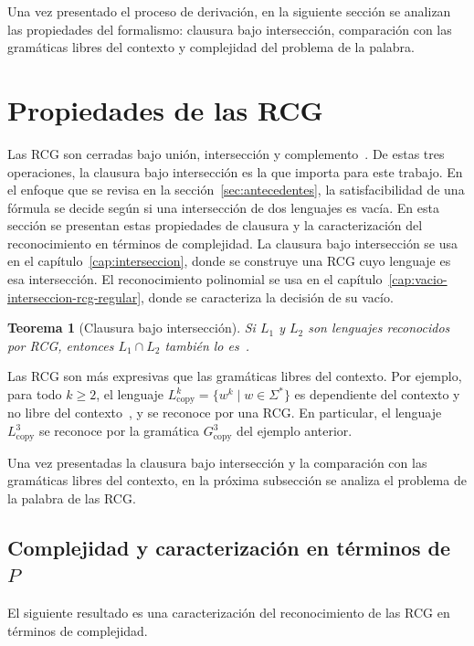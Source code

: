 \documentclass{report}
\theoremstyle{definition}
\theoremstyle{plain}
\newtheorem{teorema}{Teorema}[chapter]
\theoremstyle{remark}
\begin{document}
Una vez presentado el proceso de derivación, en la siguiente sección se
analizan las propiedades del formalismo: clausura bajo intersección,
comparación con las gramáticas libres del contexto y complejidad del
problema de la palabra.

\section{Propiedades de las RCG}
\label{sec:propiedades-rcg}

Las RCG son cerradas bajo unión, intersección y
complemento~\cite{boullier1998proposal}. De estas tres operaciones, la
clausura bajo intersección es la que importa para este trabajo. En el
enfoque que
se revisa en la sección~\ref{sec:antecedentes}, la satisfacibilidad de
una fórmula se decide según si una intersección de dos lenguajes es
vacía. En esta sección se presentan estas propiedades de clausura y la
caracterización del reconocimiento en términos de complejidad. La
clausura bajo intersección se usa en el capítulo~\ref{cap:interseccion},
donde se construye una RCG cuyo lenguaje es esa intersección. El
reconocimiento polinomial se usa en el
capítulo~\ref{cap:vacio-interseccion-rcg-regular}, donde se caracteriza la
decisión de su vacío.

\begin{teorema}[Clausura bajo intersección]
\label{teo:clausura-rcg}
Si $L_1$ y $L_2$ son lenguajes reconocidos por RCG, entonces
$L_1 \cap L_2$ también lo es~\cite{boullier1998proposal}.
\end{teorema}

Las RCG son más expresivas que las gramáticas libres del contexto. Por
ejemplo, para todo $k \ge 2$, el lenguaje $L_{\mathrm{copy}}^k = \{ w^k
\mid w \in \Sigma^*\}$ es dependiente del contexto y no libre del
contexto~\cite{hopcroft2006introduction}, y se reconoce por una RCG. En
particular, el lenguaje $L_{\mathrm{copy}}^3$ se reconoce por la
gramática $G_{\mathrm{copy}}^3$ del ejemplo anterior.

Una vez presentadas la clausura bajo intersección y la comparación con
las gramáticas libres del contexto, en la próxima subsección se analiza
el problema de la palabra de las RCG.

\subsection{Complejidad y caracterización en términos de $P$}

El siguiente resultado es una caracterización del reconocimiento de las
RCG en términos de complejidad.
\end{document}
